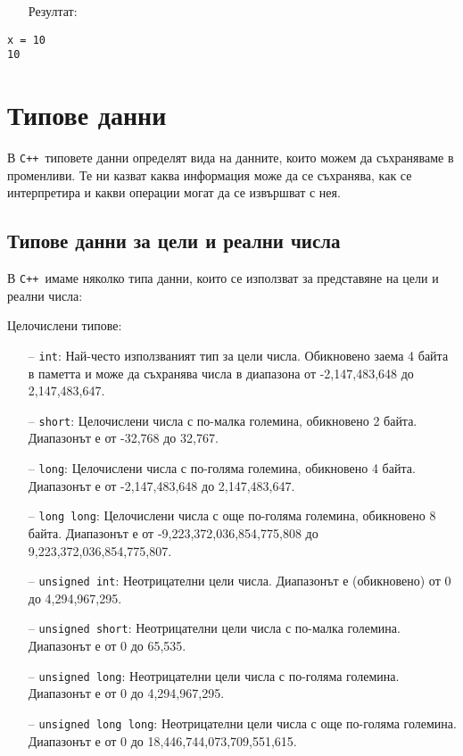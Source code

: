 \documentclass[oneside]{book}
\newcommand*{\code}[1]{\texttt{#1}}
\newcommand*{\cpp}{\texttt{C++}\ }
\begin{document}
\begin{itemize}\item[Резултат:]\end{itemize}
\begin{mdframed}\begin{lstlisting}[language={}]
x = 10
10
\end{lstlisting}\end{mdframed}

\chapter{Типове данни}
В \cpp типовете данни определят вида на данните, които можем да съхраняваме в променливи. Те ни казват каква информация може да се съхранява, как се интерпретира и какви операции могат да се извършват с нея.
\section{Типове данни за цели и реални числа}
В \cpp имаме няколко типа данни, които се използват за представяне на цели и реални числа:

Целочислени типове:
\begin{itemize}
    \item[--] \code{int}: Най-често използваният тип за цели числа. Обикновено заема 4 байта в паметта и може да съхранява числа в диапазона от -2,147,483,648 до 2,147,483,647.
    \item[--] \code{short}: Целочислени числа с по-малка големина, обикновено 2 байта. Диапазонът е от -32,768 до 32,767.
    \item[--] \code{long}: Целочислени числа с по-голяма големина, обикновено 4 байта. Диапазонът е от -2,147,483,648 до 2,147,483,647.
    \item[--] \code{long long}: Целочислени числа с още по-голяма големина, обикновено 8 байта. Диапазонът е от -9,223,372,036,854,775,808 до 9,223,372,036,854,775,807.
    \item[--] \code{unsigned int}: Неотрицателни цели числа. Диапазонът е (обикновено) от 0 до 4,294,967,295.
    \item[--] \code{unsigned short}: Неотрицателни цели числа с по-малка големина. Диапазонът е от 0 до 65,535.
    \item[--] \code{unsigned long}: Неотрицателни цели числа с по-голяма големина. Диапазонът е от 0 до 4,294,967,295.
    \item[--] \code{unsigned long long}: Неотрицателни цели числа с още по-голяма големина. Диапазонът е от 0 до 18,446,744,073,709,551,615.
\end{itemize}
\end{document}
